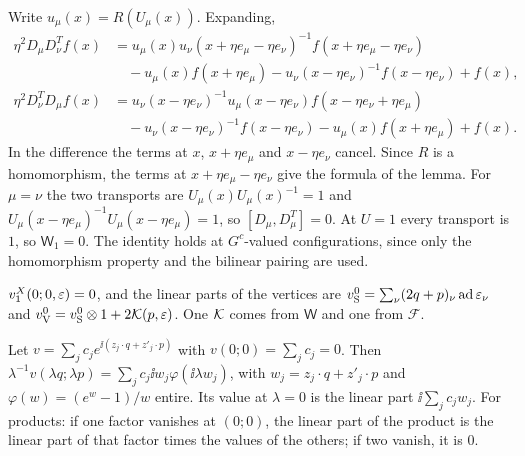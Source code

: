 \begin{step}
Write $u_\mu(x)=R(U_\mu(x))$. Expanding,
\[
\begin{aligned}
\eta^2D_\mu D_\nu^Tf(x)&=u_\mu(x)u_\nu(x+\eta e_\mu-\eta e_\nu)^{-1}f(x+\eta e_\mu-\eta e_\nu)\\
&\quad-u_\mu(x)f(x+\eta e_\mu)-u_\nu(x-\eta e_\nu)^{-1}f(x-\eta e_\nu)+f(x),\\
\eta^2D_\nu^TD_\mu f(x)&=u_\nu(x-\eta e_\nu)^{-1}u_\mu(x-\eta e_\nu)f(x-\eta e_\nu+\eta e_\mu)\\
&\quad-u_\nu(x-\eta e_\nu)^{-1}f(x-\eta e_\nu)-u_\mu(x)f(x+\eta e_\mu)+f(x).
\end{aligned}
\]
In the difference the terms at $x$, $x+\eta e_\mu$ and $x-\eta e_\nu$ cancel. Since $R$ is a homomorphism, the terms at $x+\eta e_\mu-\eta e_\nu$ give the formula of the lemma. For $\mu=\nu$ the two transports are $U_\mu(x)U_\mu(x)^{-1}=1$ and $U_\mu(x-\eta e_\mu)^{-1}U_\mu(x-\eta e_\mu)=1$, so $[D_\mu,D_\mu^T]=0$. At $U=1$ every transport is $1$, so $\mathsf W_1=0$. The identity holds at $G^c$-valued configurations, since only the homomorphism property and the bilinear pairing are used.
\end{step}

\begin{detail}\label{d11b:naive-limit}
$v_1^X(0;0,\varepsilon)=0$, and the linear parts of the vertices are $v^0_{\rm S}=\sum_\nu(2q+p)_\nu\operatorname{ad}\varepsilon_\nu$ and $v^0_{\rm V}=v^0_{\rm S}\otimes1+2\mathcal K(p,\varepsilon)$. One $\mathcal K$ comes from $\mathsf W$ and one from $\mathcal F$.
\end{detail}

\begin{step}
Let $v=\sum_jc_je^{\ii(z_j\cdot q+z'_j\cdot p)}$ with $v(0;0)=\sum_jc_j=0$. Then $\lambda^{-1}v(\lambda q;\lambda p)=\sum_jc_j\ii w_j\varphi(\ii\lambda w_j)$, with $w_j=z_j\cdot q+z'_j\cdot p$ and $\varphi(w)=(e^w-1)/w$ entire. Its value at $\lambda=0$ is the linear part $\ii\sum_jc_jw_j$. For products: if one factor vanishes at $(0;0)$, the linear part of the product is the linear part of that factor times the values of the others; if two vanish, it is $0$.
\end{step}

